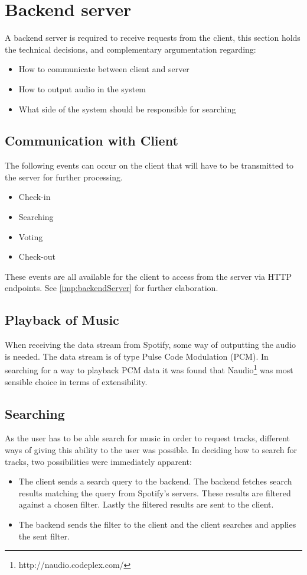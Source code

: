 \section{Backend server}
\label{techPlat:backendServer}

A backend server is required to receive requests from the client, this section holds the technical decisions, and complementary argumentation regarding:
\begin{itemize}
  \item How to communicate between client and server
  \item How to output audio in the system
  \item What side of the system should be responsible for searching
\end{itemize}

\subsection{Communication with Client}
The following events can occur on the client that will have to be
transmitted to the server for further processing.

\begin{itemize}
\item Check-in
\item Searching
\item Voting
\item Check-out
\end{itemize}

These events are all available for the client to access from the server
via HTTP endpoints. See \cref{imp:backendServer} for further elaboration.

\subsection{Playback of Music}
When receiving the data stream from Spotify, some way of outputting the audio is needed. The data stream is of type Pulse Code Modulation (PCM). In searching for a way to playback PCM data it was found that Naudio\footnote{http://naudio.codeplex.com/} was most sensible choice in terms of extensibility.

\subsection{Searching}
As the user has to be able search for music in order to request tracks, different ways of giving this ability to the user was possible. In deciding how to search for tracks, two possibilities were immediately apparent:
\begin{itemize}
  \item The client sends a search query to the backend. The backend fetches search results matching the query from Spotify's servers. These results are filtered against a chosen filter. Lastly the filtered results are sent to the client.
  \item The backend sends the filter to the client and the client searches and applies the sent filter.
\end{itemize}


